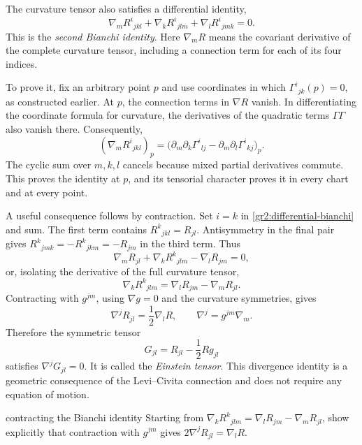 \documentclass[11pt,a4paper]{article}
\numberwithin{equation}{section}
\begin{document}
The curvature tensor also satisfies a differential identity,
\begin{equation}
 \nabla_m R^i{}_{jkl}
 +\nabla_k R^i{}_{jlm}
 +\nabla_l R^i{}_{jmk}=0.
 \label{gr2:differential-bianchi}
\end{equation}
This is the \emph{second Bianchi identity}. Here \(\nabla_mR\)
means the covariant derivative of the complete curvature tensor,
including a connection term for each of its four indices.

To prove it, fix an arbitrary point \(p\) and use coordinates in
which \(\Gamma^i{}_{jk}(p)=0\), as constructed earlier. At \(p\),
the connection terms in \(\nabla R\) vanish. In differentiating
the coordinate formula for curvature, the derivatives of the
quadratic terms \(\Gamma\Gamma\) also vanish there. Consequently,
\[
 (\nabla_m R^i{}_{jkl})_p
 =\bigl(\partial_m\partial_k\Gamma^i{}_{lj}
        -\partial_m\partial_l\Gamma^i{}_{kj}\bigr)_p.
\]
The cyclic sum over \(m,k,l\) cancels because mixed partial
derivatives commute. This proves the identity at \(p\), and its
tensorial character proves it in every chart and at every point.

A useful consequence follows by contraction. Set \(i=k\) in
\eqref{gr2:differential-bianchi} and sum. The first term contains
\(R^k{}_{jkl}=R_{jl}\). Antisymmetry in the final pair gives
\(R^k{}_{jmk}=-R^k{}_{jkm}=-R_{jm}\) in the third term. Thus
\[
 \nabla_m R_{jl}+\nabla_k R^k{}_{jlm}-\nabla_l R_{jm}=0,
\]
or, isolating the derivative of the full curvature tensor,
\[
 \nabla_k R^k{}_{jlm}
 =\nabla_l R_{jm}-\nabla_m R_{jl}.
\]
Contracting with \(g^{jm}\), using \(\nabla g=0\) and the curvature
symmetries, gives
\begin{equation}
 \nabla^jR_{jl}=\frac12\nabla_l R,
 \qquad \nabla^j=g^{jm}\nabla_m.
 \label{gr2:contracted-bianchi}
\end{equation}
Therefore the symmetric tensor
\begin{equation}
 G_{jl}=R_{jl}-\frac12 Rg_{jl}
 \label{gr2:einstein-tensor}
\end{equation}
satisfies \(\nabla^jG_{jl}=0\). It is called the \emph{Einstein
tensor}. This divergence identity is a geometric consequence of the
Levi--Civita connection and does not require any equation of motion.

\begin{studentwork}[2.7cm]{contracting the Bianchi identity}
Starting from \(\nabla_kR^k{}_{jlm}=\nabla_lR_{jm}-\nabla_mR_{jl}\),
show explicitly that contraction with \(g^{jm}\) gives
\(2\nabla^jR_{jl}=\nabla_lR\).
\end{studentwork}
\end{document}
